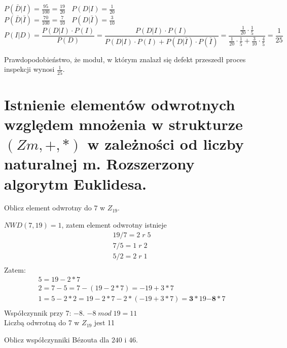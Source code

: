 \documentclass[12pt]{article}
\begin{document}
    $P(\bar{D}|I) = \frac{95}{100} = \frac{19}{20} ~ ~ ~ ~ P(D|I) = \frac{1}{20}$ \\

    $P(\bar{D}|\bar{I}) = \frac{70}{100} = \frac{7}{10} ~ ~ ~ ~ P(D|\bar{I}) = \frac{3}{10}$ \\

    \begin{equation*}
        P(I|D) = \frac{P(D|I)\cdot P(I)}{P(D)} = \frac{P(D|I)\cdot P(I)}{P(D|I)\cdot P(I) + P(D|\bar{I})\cdot P(\bar{I})} = \frac{\frac{1}{20}\cdot \frac{1}{5}}{\frac{1}{20}\cdot \frac{1}{5} + \frac{3}{10}\cdot \frac{4}{5}} = \frac{1}{25}
    \end{equation*}

    Prawdopodobieństwo, że moduł, w którym znalazł się defekt przeszedł proces inspekcji wynosi $\frac{1}{25}$.

    \newpage

    \section{Istnienie elementów odwrotnych względem mnożenia w strukturze $(Zm, +, *)$ w zależności od liczby naturalnej m. Rozszerzony algorytm Euklidesa.}
    \begin{exercise}
        Oblicz element odwrotny do $\mathrm{7}$ w $Z_{19}$.
    \end{exercise}

    $ NWD(7, 19) = 1 $, zatem element odwrotny istnieje
    \begin{gather*}
        19 / 7 = 2 \;r\; 5\\
        7 / 5 = 1 \;r\; 2\\
        5 / 2 = 2\; r\; 1\\
    \end{gather*}
    Zatem:
    \begin{gather*}
        5 = 19 - 2  * 7\\
        2 = 7 - 5 = 7 - (19 - 2 * 7) = -19 + 3 * 7\\
        1 = 5 - 2 * 2 = 19 - 2 * 7 - 2 * (-19 + 3 * 7) = \mathbf{3} * 19 \mathbf{- 8} * 7\\
    \end{gather*}
    Współczynnik przy 7: $-8$. $-8\; mod\; 19 = 11$\\
    Liczbą odwrotną do 7 w $Z_{19}$ jest 11
    \begin{exercise}
        Oblicz współczynniki Bézouta dla $\mathrm{240}$ i $\mathrm{46}$.
    \end{exercise}
\end{document}
